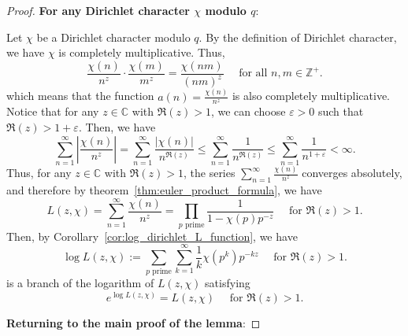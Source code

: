 \documentclass{elegantbook}
\begin{document}
\begin{proof}
  \textbf{For any Dirichlet character $\chi$ modulo $q$}:
  
  Let $\chi$ be a Dirichlet character modulo $q$. By the definition of Dirichlet character, we have $\chi$ is completely multiplicative. Thus, 
  \[
    \frac{\chi(n)}{n^z} \cdot \frac{\chi(m)}{m^z} = \frac{\chi(nm)}{(nm)^z} \quad \text{ for all } n,m \in \mathbb{Z}^+.
  \]  
  which means that the function $a(n) = \frac{\chi(n)}{n^z}$ is also completely multiplicative. Notice that for any $z \in \mathbb{C}$ with $\Re(z) > 1$, we can choose $\varepsilon>0$ such that $\Re(z) > 1 + \varepsilon$. Then, we have
  \[
    \sum_{n=1}^{\infty} \left| \frac{\chi(n)}{n^z} \right| = \sum_{n=1}^{\infty} \frac{|\chi(n)|}{n^{\Re(z)}} \leq \sum_{n=1}^{\infty} \frac{1}{n^{\Re(z)}} \leq \sum_{n=1}^{\infty} \frac{1}{n^{1+\varepsilon}} < \infty.
  \]
  Thus, for any $z \in \mathbb{C}$ with $\Re(z) > 1$, the series $\sum_{n=1}^{\infty} \frac{\chi(n)}{n^z}$ converges absolutely, and therefore by theorem~\ref{thm:euler_product_formula}, we have
  \[
    L(z,\chi) = \sum_{n=1}^{\infty} \frac{\chi(n)}{n^z} = \prod_{p \text{ prime}} \frac{1}{1 - \chi(p)p^{-z}} \quad \text{ for } \Re(z) > 1.
  \]
  Then, by Corollary~\ref{cor:log_dirichlet_L_function}, we have
  \[
    \log L(z,\chi) := \sum_{p \text{ prime}} \sum_{k=1}^{\infty} \frac{1}{k} \chi(p^k) p^{-kz} \quad \text{ for } \Re(z) > 1.
  \]
  is a branch of the logarithm of $L(z,\chi)$ satisfying
  \[
    e^{\log L(z,\chi)} = L(z,\chi) \quad \text{ for } \Re(z) > 1.
  \]

  \textbf{Returning to the main proof of the lemma}:
  

\end{proof}
\end{document}
